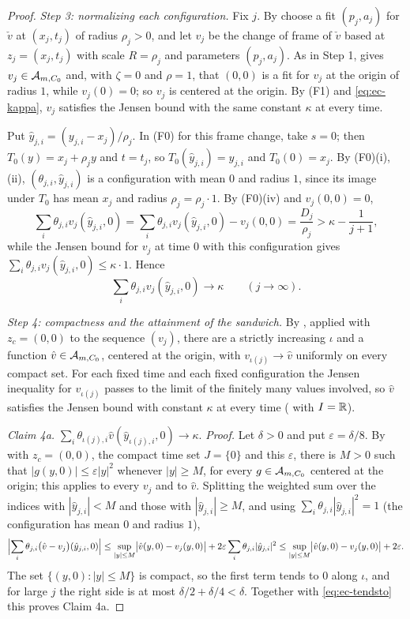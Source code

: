 \begin{proof}
\emph{Step 3: normalizing each configuration.}
Fix $j$. By  choose a fit $(p_j,a_j)$ for $\check v$ at
$(x_j,t_j)$ of radius $\rho_j>0$, and let $v_j$ be the change of frame
 of $\check v$ based at $z_j=(x_j,t_j)$ with scale
$R=\rho_j$ and parameters $(p_j,a_j)$. As in Step 1,
 gives $v_j\in\mathcal{A}_{m,C_0}$ and, with $\zeta=0$ and
$\rho=1$, that $(0,0)$ is a fit for $v_j$ at the origin of radius $1$, while
$v_j(0)=0$; so $v_j$ is centered at the origin. By (F1) and
\eqref{eq:ec-kappa}, $v_j$ satisfies the Jensen bound with the same constant
$\kappa$ at every time.

Put $\hat y_{j,i}=(y_{j,i}-x_j)/\rho_j$. In (F0) for this frame change, take
$s=0$; then $T_0(y)=x_j+\rho_jy$ and $t=t_j$, so $T_0(\hat y_{j,i})=y_{j,i}$ and
$T_0(0)=x_j$. By (F0)(i),(ii), $(\theta_{j,i},\hat y_{j,i})$ is a configuration
with mean $0$ and radius $1$, since its image under $T_0$ has mean $x_j$ and
radius $\rho_j=\rho_j\cdot1$. By (F0)(iv) and $v_j(0,0)=0$,
\[
  \sum_i\theta_{j,i}v_j(\hat y_{j,i},0)
    =\sum_i\theta_{j,i}v_j(\hat y_{j,i},0)-v_j(0,0)
    =\frac{D_j}{\rho_j}>\kappa-\frac1{j+1},
\]
while the Jensen bound for $v_j$ at time $0$ with this configuration gives
$\sum_i\theta_{j,i}v_j(\hat y_{j,i},0)\le\kappa\cdot1$. Hence
\begin{equation}\label{eq:ec-tendsto}
  \sum_i\theta_{j,i}v_j(\hat y_{j,i},0)\longrightarrow\kappa
  \qquad(j\to\infty).
\end{equation}

\emph{Step 4: compactness and the attainment of the sandwich.}
By , applied with $z_c=(0,0)$ to the sequence
$(v_j)$, there are a strictly increasing $\iota$ and a function
$\hat v\in\mathcal{A}_{m,C_0}$, centered at the origin, with $v_{\iota(j)}\to\hat v$
uniformly on every compact set. For each fixed time and each fixed configuration
the Jensen inequality for $v_{\iota(j)}$ passes to the limit of the finitely
many values involved, so $\hat v$ satisfies the Jensen bound with constant
$\kappa$ at every time ( with $I=\mathbb{R}$).

\emph{Claim 4a.} $\displaystyle
  \sum_i\theta_{\iota(j),i}\hat v(\hat y_{\iota(j),i},0)\to\kappa$.
\emph{Proof.} Let $\delta>0$ and put $\varepsilon=\delta/8$. By
 with $z_c=(0,0)$, the compact time set $J=\{0\}$
and this $\varepsilon$, there is $M>0$ such that $|g(y,0)|\le\varepsilon|y|^2$
whenever $|y|\ge M$, for every $g\in\mathcal{A}_{m,C_0}$ centered at the origin;
this applies to every $v_j$ and to $\hat v$. Splitting the weighted sum over the
indices with $|\hat y_{j,i}|<M$ and those with $|\hat y_{j,i}|\ge M$, and using
$\sum_i\theta_{j,i}|\hat y_{j,i}|^2=1$ (the configuration has mean $0$ and
radius $1$),
\[
  \Bigl|\sum_i\theta_{j,i}\bigl(\hat v-v_j\bigr)(\hat y_{j,i},0)\Bigr|
   \le\sup_{|y|\le M}\bigl|\hat v(y,0)-v_j(y,0)\bigr|
      +2\varepsilon\sum_i\theta_{j,i}|\hat y_{j,i}|^2
   \le\sup_{|y|\le M}\bigl|\hat v(y,0)-v_j(y,0)\bigr|+2\varepsilon .
\]
The set $\{(y,0):|y|\le M\}$ is compact, so the first term tends to $0$ along
$\iota$, and for large $j$ the right side is at most
$\delta/2+\delta/4<\delta$. Together with \eqref{eq:ec-tendsto} this proves
Claim 4a.


\end{proof}
